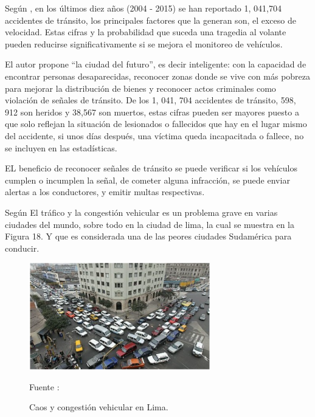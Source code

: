 \documentclass[a4paper, 12pt]{article}
\begin{document}
Según \cite{ayunque}, en los últimos diez años (2004 - 2015) se han reportado 1, 041,704 accidentes de tránsito, los principales factores que la generan son, el exceso de velocidad. Estas cifras y la probabilidad que suceda una tragedia al volante pueden reducirse significativamente si se mejora el monitoreo de vehículos.\par 
El autor propone “la ciudad del futuro”, es decir inteligente: con la capacidad de encontrar personas desaparecidas, reconocer zonas donde se vive con más pobreza para mejorar la distribución de bienes y reconocer actos criminales como violación de señales de tránsito. 
De los 1, 041, 704 accidentes de tránsito, 598, 912 son heridos y 38,567 son muertos, estas cifras pueden ser mayores puesto a que solo reflejan la situación de lesionados o fallecidos que hay  en el lugar mismo del accidente, si unos días después, una víctima queda incapacitada o fallece, no se incluyen en las estadísticas.\par
EL beneficio de reconocer señales de tránsito se puede verificar si los vehículos cumplen o incumplen la señal, de cometer alguna infracción, se puede enviar alertas a los conductores, y emitir multas respectivas.\par
Según  \cite{ayunque} El tráfico y la congestión vehicular es un problema grave en varias ciudades del mundo, sobre todo en la ciudad de lima, la cual se muestra en la Figura 18. Y que es considerada una de las peores ciudades Sudamérica para conducir.\par


\begin{figure}[ht]
\begin{center}
\includegraphics[width=0.7\textwidth]{problema1}
\end{center}
\begin{center}
\vskip -0.5cm
\caption{\small{Caos y congestión vehicular en Lima.}}
{\small{Fuente : \cite{ayunque}}}
\end{center}
\end{figure}
\end{document}
